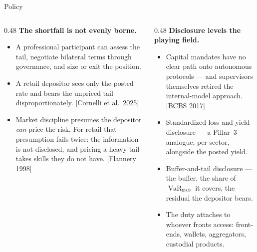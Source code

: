 \documentclass[10pt,xcolor=x11names,aspectratio=169]{beamer}
\newcommand{\VaR}{\operatorname{VaR}}
\newcommand{\src}[1]{[#1]}
\begin{document}
\begin{frame}{Policy}
  \vskip -2mm
  \begin{columns}[T]
    \begin{column}{0.48\textwidth}
      \textbf{The shortfall is not evenly borne.}
      \small
      \begin{itemize}
        \item A professional participant can assess the tail, negotiate
              bilateral terms through governance, and size or exit the
              position.
        \item A retail depositor sees only the posted rate and bears the
              unpriced tail disproportionately.
              \src{Cornelli et al.\ 2025}
        \item Market discipline presumes the depositor \emph{can} price the
              risk. For retail that presumption fails twice: the information
              is not disclosed, and pricing a heavy tail takes skills they do
              not have. \src{Flannery 1998}
      \end{itemize}
    \end{column}
    \begin{column}{0.48\textwidth}
      \textbf{Disclosure levels the playing field.}
      \small
      \begin{itemize}
        \item Capital mandates have no clear path onto autonomous protocols
              --- and supervisors themselves retired the internal-model
              approach. \src{BCBS 2017}
        \item Standardized loss-and-yield disclosure --- a Pillar~3 analogue,
              per sector, alongside the posted yield.
        \item Buffer-and-tail disclosure --- the buffer, the share of
              $\VaR_{99.9}$ it covers, the residual the depositor bears.
        \item The duty attaches to whoever fronts access: front-ends, wallets,
              aggregators, custodial products.
      \end{itemize}
    \end{column}
  \end{columns}
\end{frame}
\end{document}
